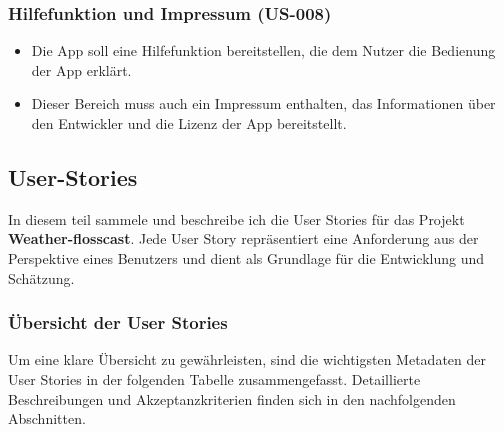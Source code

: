 \documentclass{article}
\begin{document}
\subsubsection{Hilfefunktion und Impressum (US-008)}
\begin{itemize}
    \item Die App soll eine Hilfefunktion bereitstellen, die dem Nutzer die Bedienung der App erklärt.
    \item Dieser Bereich muss auch ein Impressum enthalten, das Informationen über den Entwickler und die Lizenz der App bereitstellt.
\end{itemize}

\subsection{User-Stories}
In diesem teil sammele und beschreibe ich die User Stories für das Projekt \textbf{Weather-flosscast}. Jede User Story repräsentiert eine Anforderung aus der Perspektive eines Benutzers und dient als Grundlage für die Entwicklung und Schätzung.

\subsubsection{Übersicht der User Stories}
Um eine klare Übersicht zu gewährleisten, sind die wichtigsten Metadaten der User Stories in der folgenden Tabelle zusammengefasst. Detaillierte Beschreibungen und Akzeptanzkriterien finden sich in den nachfolgenden Abschnitten.

\setlength{\LTpre}{0pt} %
\setlength{\LTpost}{0pt} %
\end{document}
